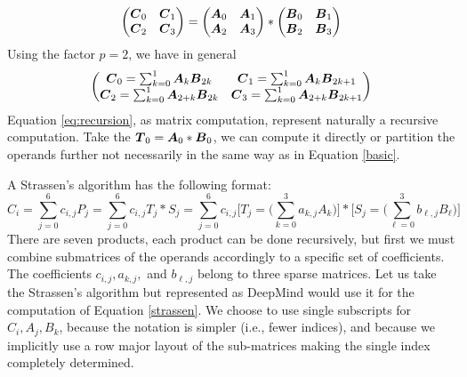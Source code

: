 \documentclass[acmsmall]{acmart}
\begin{document}
\begin{equation}
  \label{basic}
  \begin{pmatrix}
    {\boldsymbol C}_0 & {\boldsymbol C}_1 \\
    {\boldsymbol C}_2 & {\boldsymbol C}_3 \\
  \end{pmatrix} =
  \begin{pmatrix}
    {\boldsymbol A}_0 & {\boldsymbol A}_1 \\
    {\boldsymbol A}_2 & {\boldsymbol A}_3 \\
  \end{pmatrix} *
  \begin{pmatrix}
    {\boldsymbol B}_0 & {\boldsymbol B}_1 \\
    {\boldsymbol B}_2 & {\boldsymbol B}_3 \\
  \end{pmatrix} 
\end{equation}
Using the factor $p=2$, we have in general
\begin{equation}
  \label{eq:recursion}
  \begin{pmatrix} 
    {\boldsymbol C}_0 = \sum_{k=0}^{1}{\boldsymbol A}_k    {\boldsymbol B}_{2k} &
    {\boldsymbol C}_1 = \sum_{k=0}^{1}{\boldsymbol A}_k    {\boldsymbol B}_{2k+1} \\
    {\boldsymbol C}_2 = \sum_{k=0}^{1}{\boldsymbol A}_{2+k} {\boldsymbol B}_{2k} &
    {\boldsymbol C}_3 = \sum_{k=0}^{1}{\boldsymbol A}_{2+k} {\boldsymbol B}_{2k+1} \\
  \end{pmatrix}
\end{equation}
Equation \ref{eq:recursion}, as matrix computation, represent
naturally a recursive computation. Take the ${\boldsymbol T}_0={\boldsymbol A}_0*{\boldsymbol B}_0$, we
can compute it directly or partition the operands further not necessarily in the same way as in Equation \ref{basic}.  

A Strassen's algorithm has the following format:
\begin{equation}
  \label{strassen}
C_i = \sum_{j=0}^6 c_{i,j}P_j =\sum_{j=0}^6 c_{i,j}T_j*S_j  
=\sum_{j=0}^6 c_{i,j}\Big[ T_j = \big(\sum_{k=0}^3
  a_{k,j}A_k\big)\Big]* \Big[S_j = \big(\sum_{\ell=0}^3 b_{\ell,j}B_\ell\big) \Big]
\end{equation}
There are seven products, each product can be done recursively, but
first we must combine submatrices of the operands accordingly to a
specific set of coefficients. The coefficients $c_{i,j},a_{k,j},$ and
$b_{\ell,j}$ belong to three sparse matrices. Let us take the
Strassen's algorithm but represented as DeepMind would use it for the
computation of Equation \ref{strassen}. We choose to use single
subscripts for $C_i, A_j, B_k$, because the notation is simpler (i.e.,
fewer indices), and because we implicitly use a row major layout of
the sub-matrices making the single index completely determined.
\end{document}
